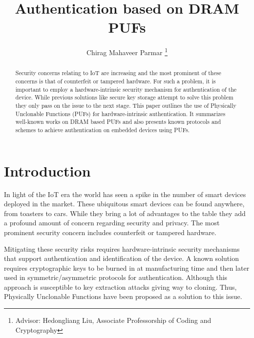 \documentclass[journal, a4paper]{IEEEtran}
\begin{document}
\title{Authentication based on DRAM PUFs}
\author{Chirag Mahaveer Parmar
\thanks{Advisor: Hedongliang Liu, Associate Professorship of Coding and Cryptography}}
\maketitle

\begin{abstract}
Security concerns relating to IoT are increasing and the most prominent of these concerns is that of counterfeit or tampered hardware. For such a problem, it is important to employ a hardware-intrinsic security mechanism for authentication of the device. While previous solutions like secure key storage attempt to solve this problem they only pass on the issue to the next stage. This paper outlines the use of Physically Unclonable Functions (PUFs) for hardware-intrinsic authentication. It summarizes well-known works on DRAM based PUFs and also presents known protocols and schemes to achieve authentication on embedded devices using PUFs.
\end{abstract}

\section{Introduction}
 In light of the IoT era the world has seen a spike in the number of smart devices deployed in the market. These ubiquitous smart devices can be found anywhere, from toasters to cars. While they bring a lot of advantages to the table they add a profound amount of concern regarding security and privacy. \cite{EMVT12} The most prominent security concern includes counterfeit or tampered hardware. \cite{PEC06} 

Mitigating these security risks requires hardware-intrinsic security mechanisms that support authentication and identification of the device. A known solution requires cryptographic keys to be burned in at manufacturing time and then later used in symmetric/asymmetric protocols for authentication. Although this approach is susceptible to key extraction attacks giving way to cloning. Thus, Physically Unclonable Functions have been proposed as a solution to this issue.
\end{document}
